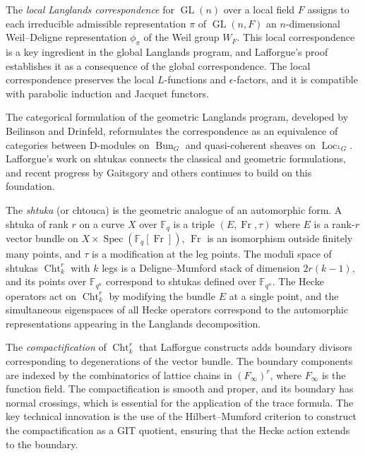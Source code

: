 The \emph{local Langlands correspondence} for $\operatorname{GL}(n)$ over a local field $F$ assigns to each irreducible admissible representation $\pi$ of $\operatorname{GL}(n, F)$ an $n$-dimensional Weil--Deligne representation $\phi_\pi$ of the Weil group $W_F$. This local correspondence is a key ingredient in the global Langlands program, and Lafforgue's proof establishes it as a consequence of the global correspondence. The local correspondence preserves the local $L$-functions and $\epsilon$-factors, and it is compatible with parabolic induction and Jacquet functors.

The categorical formulation of the geometric Langlands program, developed by Beilinson and Drinfeld, reformulates the correspondence as an equivalence of categories between D-modules on $\operatorname{Bun}_G$ and quasi-coherent sheaves on $\operatorname{Loc}_{{}^L G}$. Lafforgue's work on shtukas connects the classical and geometric formulations, and recent progress by Gaitsgory and others continues to build on this foundation.

The \emph{shtuka} (or chtouca) is the geometric analogue of an automorphic form. A shtuka of rank $r$ on a curve $X$ over $\mathbb{F}_q$ is a triple $(E, \operatorname{Fr}, \tau)$ where $E$ is a rank-$r$ vector bundle on $X \times \operatorname{Spec}(\mathbb{F}_q[\operatorname{Fr}])$, $\operatorname{Fr}$ is an isomorphism outside finitely many points, and $\tau$ is a modification at the leg points. The moduli space of shtukas $\operatorname{Cht}^r_k$ with $k$ legs is a Deligne--Mumford stack of dimension $2r(k-1)$, and its points over $\mathbb{F}_{q^n}$ correspond to shtukas defined over $\mathbb{F}_{q^n}$. The Hecke operators act on $\operatorname{Cht}^r_k$ by modifying the bundle $E$ at a single point, and the simultaneous eigenspaces of all Hecke operators correspond to the automorphic representations appearing in the Langlands decomposition.

The \emph{compactification} of $\operatorname{Cht}^r_k$ that Lafforgue constructs adds boundary divisors corresponding to degenerations of the vector bundle. The boundary components are indexed by the combinatorics of lattice chains in $(F_\infty)^r$, where $F_\infty$ is the function field. The compactification is smooth and proper, and its boundary has normal crossings, which is essential for the application of the trace formula. The key technical innovation is the use of the Hilbert--Mumford criterion to construct the compactification as a GIT quotient, ensuring that the Hecke action extends to the boundary.

